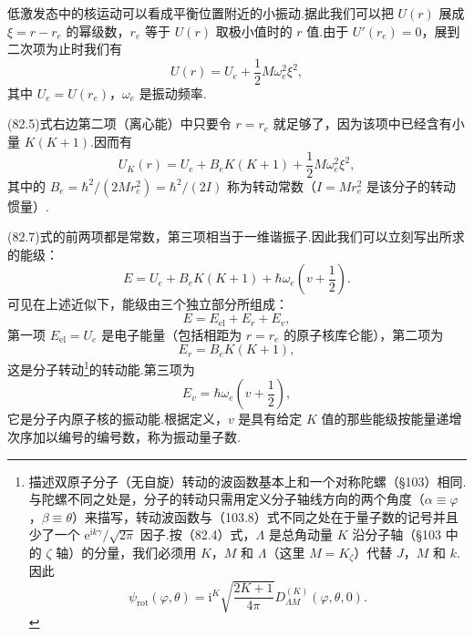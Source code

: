 低激发态中的核运动可以看成平衡位置附近的小振动.据此我们可以把 $U(r)$ 展成 $\xi=r-r_e$ 的幂级数，$r_e$ 等于 $U(r)$ 取极小值时的 $r$ 值.由于 $U'(r_e)=0$，展到二次项为止时我们有
\begin{equation*}
  U(r)=U_e+\frac{1}{2}M\omega_e^2\xi^2,
\end{equation*}
其中 $U_e=U(r_e)$，$\omega_e$ 是振动频率.

(82.5)式右边第二项（离心能）中只要令 $r=r_e$ 就足够了，因为该项中已经含有小量 $K(K+1)$.因而有
\begin{equation}
  U_K(r)=U_e+B_eK(K+1)+\frac{1}{2}M\omega_e^2\xi^2,
\end{equation}
其中的 $B_e=\hbar^2/(2Mr_e^2)=\hbar^2/(2I)$ 称为转动常数（$I=Mr_e^2$ 是该分子的转动惯量）.

(82.7)式的前两项都是常数，第三项相当于一维谐振子.因此我们可以立刻写出所求的能级：
\begin{equation}
  E=U_e+B_eK(K+1)+\hbar\omega_e\left(v+\frac{1}{2}\right).
\end{equation}
可见在上述近似下，能级由三个独立部分所组成：
\begin{equation}
  E=E_{\mathrm{el}}+E_r+E_v,
\end{equation}
第一项 $E_{\mathrm{el}}=U_e$ 是电子能量（包括相距为 $r=r_e$ 的原子核库仑能），第二项为
\begin{equation}
  E_r=B_eK(K+1),
\end{equation}
这是分子转动\footnote{描述双原子分子（无自旋）转动的波函数基本上和一个对称陀螺（§103）相同.与陀螺不同之处是，分子的转动只需用定义分子轴线方向的两个角度（$\alpha\equiv\varphi$，$\beta\equiv\theta$）来描写，转动波函数与（103.8）式不同之处在于量子数的记号并且少了一个 $\mathrm{e}^{\mathrm{i}k\gamma}/\sqrt{2\pi}$ 因子.按（82.4）式，$\Lambda$ 是总角动量 $K$ 沿分子轴（§103 中的 $\zeta$ 轴）的分量，我们必须用 $K$，$M$ 和 $\Lambda$（这里 $M=K_\zeta$）代替 $J$，$M$ 和 $k$.因此
\begin{equation*}
  \psi_{\mathrm{rot}}(\varphi,\theta)=\mathrm{i}^K\sqrt{\frac{2K+1}{4\pi}}D^{(K)}_{\Lambda M}(\varphi,\theta,0).
\end{equation*}}的转动能.第三项为
\begin{equation}
  E_v=\hbar\omega_e\left(v+\frac{1}{2}\right),
\end{equation}
它是分子内原子核的振动能.根据定义，$v$ 是具有给定 $K$ 值的那些能级按能量递增次序加以编号的编号数，称为振动量子数.


